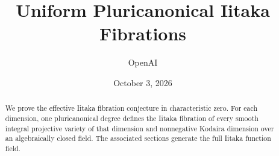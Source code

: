 \documentclass[11pt]{article}
\title{Uniform Pluricanonical Iitaka Fibrations}
\author{OpenAI}
\date{October 3, 2026}
\theoremstyle{definition}
\theoremstyle{remark}
\numberwithin{equation}{section}
\begin{document}
\maketitle
\begin{abstract}
We prove the effective Iitaka fibration conjecture in characteristic zero.
For each dimension, one pluricanonical degree defines the Iitaka fibration
of every smooth integral projective variety of that dimension and nonnegative
Kodaira dimension over an algebraically closed field. The associated sections
generate the full Iitaka function field.
\end{abstract}
\tableofcontents








\end{document}

